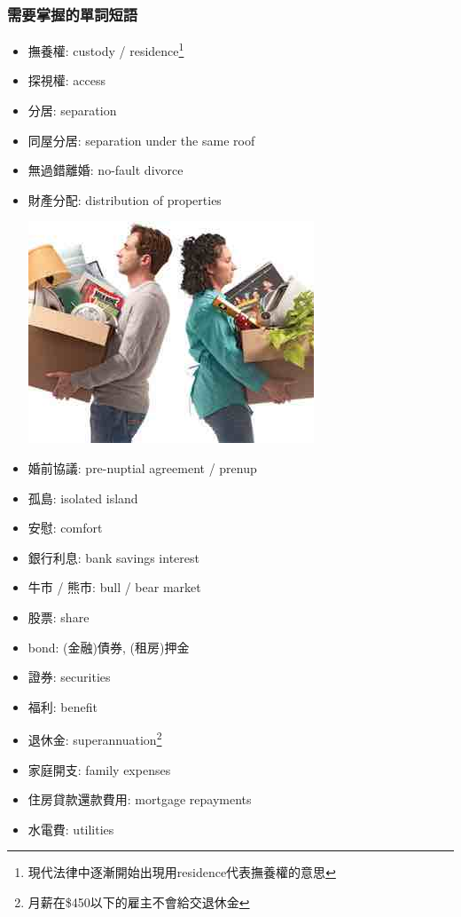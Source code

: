 \subsubsection*{需要掌握的單詞短語}
\begin{multicols}{2}
\begin{itemize}
  \itemsep0em
  \item 撫養權: custody / residence\footnote{現代法律中逐漸開始出現用residence代表撫養權的意思}
  \item 探視權: access
  \item 分居: separation
  \item 同屋分居: separation under the same roof
  \item 無過錯離婚: no-fault divorce
  \item 財產分配: distribution of properties
  \begin{center}
  	\includegraphics[scale=.66]{pics/split-property}
  \end{center}
  \item 婚前協議: pre-nuptial agreement / prenup
  \item 孤島: isolated island
  \item 安慰: comfort
  \item 銀行利息: bank savings interest
  \item 牛市 / 熊市: bull / bear market
  \item 股票: share
  \item bond: (金融)債券, (租房)押金
  \item 證券: securities
  \item 福利: benefit
  \item 退休金: superannuation\footnote{月薪在\$450以下的雇主不會給交退休金}
  \item 家庭開支: family expenses
  \item 住房貸款還款費用: mortgage repayments
  \item 水電費: utilities
\end{itemize}
\end{multicols}

